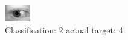 \begin{figure}[h!]
\begin{center}
\includegraphics[width=0.60\columnwidth]{figures/ID804_class_2_target_4.png}
\end{center}
\caption{ Classification: 2 actual target: 4}
\label{fig:ID804_class_2_target_4}
\end{figure}

